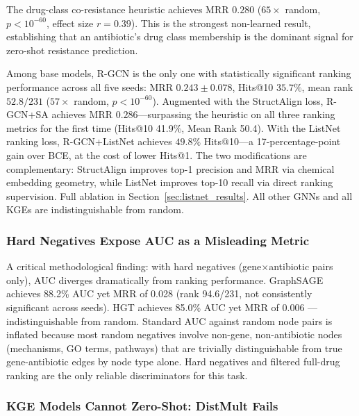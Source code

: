 \documentclass[conference]{IEEEtran}
\begin{document}
The drug-class co-resistance heuristic achieves MRR $0.280$ ($65\times$ random, $p < 10^{-60}$, effect size $r = 0.39$). This is the strongest non-learned result, establishing that an antibiotic's drug class membership is the dominant signal for zero-shot resistance prediction.

Among base models, R-GCN is the only one with statistically significant ranking performance across all five seeds: MRR $0.243 \pm 0.078$, Hits@10 $35.7\%$, mean rank $52.8/231$ ($57\times$ random, $p < 10^{-60}$). Augmented with the StructAlign loss, R-GCN+SA achieves MRR $\mathbf{0.286}$---surpassing the heuristic on all three ranking metrics for the first time (Hits@10 41.9\%, Mean Rank 50.4). With the ListNet ranking loss, R-GCN+ListNet achieves $\mathbf{49.8\%}$ Hits@10---a 17-percentage-point gain over BCE, at the cost of lower Hits@1. The two modifications are complementary: StructAlign improves top-1 precision and MRR via chemical embedding geometry, while ListNet improves top-10 recall via direct ranking supervision. Full ablation in Section~\ref{sec:listnet_results}. All other GNNs and all KGEs are indistinguishable from random.

\subsubsection{Hard Negatives Expose AUC as a Misleading Metric}

A critical methodological finding: with hard negatives (gene$\times$antibiotic pairs only), AUC diverges dramatically from ranking performance. GraphSAGE achieves 88.2\% AUC yet MRR of 0.028 (rank 94.6/231, not consistently significant across seeds). HGT achieves 85.0\% AUC yet MRR of 0.006 --- indistinguishable from random. Standard AUC against random node pairs is inflated because most random negatives involve non-gene, non-antibiotic nodes (mechanisms, GO terms, pathways) that are trivially distinguishable from true gene-antibiotic edges by node type alone. Hard negatives and filtered full-drug ranking are the only reliable discriminators for this task.

\subsubsection{KGE Models Cannot Zero-Shot: DistMult Fails}
\end{document}
